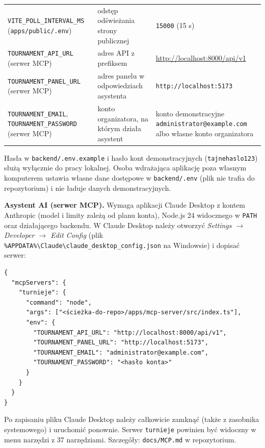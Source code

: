 \documentclass[11pt,a4paper,oneside]{article}
\newif\ifpodpowiedzi
\newcommand{\podpowiedz}[1]{\ifpodpowiedzi\par\begingroup\small\color{hintcolor}\textit{Wskazówka: #1}\par\endgroup\fi}
\begin{document}
\begin{tabularx}{\textwidth}{@{}Y Y Y@{}}
\texttt{VITE\_POLL\_INTERVAL\_MS} (\texttt{apps/public/.env}) & odstęp odświeżania strony publicznej & \texttt{15000} (15 s)\\
\texttt{TOURNAMENT\_API\_URL} (serwer MCP) & adres API z prefiksem & \url{http://localhost:8000/api/v1}\\
\texttt{TOURNAMENT\_PANEL\_URL} (serwer MCP) & adres panelu w odpowiedziach asystenta & \texttt{http://localhost:5173}\\
\texttt{TOURNAMENT\_EMAIL}, \texttt{TOURNAMENT\_PASSWORD} (serwer MCP) & konto organizatora, na którym działa asystent & konto demonstracyjne \texttt{administrator@example.com} albo własne konto organizatora\\
\bottomrule
\end{tabularx}

Hasła w \texttt{backend/.env.example} i hasło kont demonstracyjnych (\texttt{tajnehaslo123}) służą wyłącznie do pracy lokalnej. Osoba wdrażająca aplikację poza własnym komputerem ustawia własne dane dostępowe w \texttt{backend/.env} (plik nie trafia do repozytorium) i nie ładuje danych demonstracyjnych.

\podpowiedz{Jeśli AI jest częścią rozwiązania, opisz wymagane modele, usługę lub środowisko lokalne, sposób konfiguracji dostępu, sprawdzoną wersję modelu, o ile można ją ustalić, oraz zależności i limity istotne dla uruchomienia. Samo użycie AI podczas tworzenia projektu nie wymaga takiego opisu tutaj.}
\textbf{Asystent AI (serwer MCP).} Wymaga aplikacji Claude Desktop z kontem Anthropic (model i limity zależą od planu konta), Node.js 24 widocznego w \texttt{PATH} oraz działającego backendu. W Claude Desktop należy otworzyć \emph{Settings $\rightarrow$ Developer $\rightarrow$ Edit Config} (plik \texttt{\%APPDATA\%\textbackslash Claude\textbackslash claude\_desktop\_config.json} na Windowsie) i dopisać serwer:
\begin{verbatim}
{
  "mcpServers": {
    "turnieje": {
      "command": "node",
      "args": ["<ścieżka-do-repo>/apps/mcp-server/src/index.ts"],
      "env": {
        "TOURNAMENT_API_URL": "http://localhost:8000/api/v1",
        "TOURNAMENT_PANEL_URL": "http://localhost:5173",
        "TOURNAMENT_EMAIL": "administrator@example.com",
        "TOURNAMENT_PASSWORD": "<hasło konta>"
      }
    }
  }
}
\end{verbatim}
Po zapisaniu pliku Claude Desktop należy całkowicie zamknąć (także z zasobnika systemowego) i uruchomić ponownie. Serwer \texttt{turnieje} powinien być widoczny w menu narzędzi z 37 narzędziami. Szczegóły: \texttt{docs/MCP.md} w repozytorium.
\end{document}
